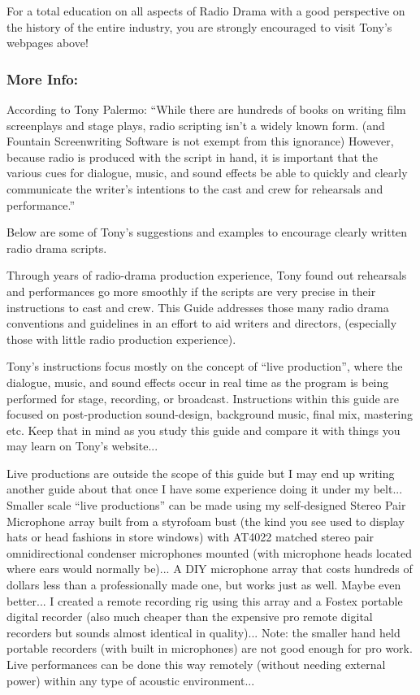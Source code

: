 \documentclass[openleft,oneside,showtrims]{memoir}
\begin{document}
For a total education on all aspects of Radio Drama with a good perspective on the history of the entire industry, you are strongly encouraged to visit Tony's webpages above!

\subsubsection*{More Info:}
\label{sec:org3eb0e5a}
According to Tony Palermo: ``While there are hundreds of books on writing film screenplays and stage plays, radio scripting isn't a widely known form. (and Fountain Screenwriting Software is not exempt from this ignorance) However, because radio is produced with the script in hand, it is important that the various cues for dialogue, music, and sound effects be able to quickly and clearly communicate the writer's intentions to the cast and crew for rehearsals and performance.''

Below are some of Tony's suggestions and examples to encourage clearly written radio drama scripts.

Through years of radio-drama production experience, Tony found out rehearsals and performances go more smoothly if the scripts are very precise in their instructions to cast and crew.  This Guide addresses those many radio drama conventions and guidelines in an effort to aid writers and directors, (especially those with little radio production experience).

Tony's instructions focus mostly on the concept of ``live production'', where the dialogue, music, and sound effects occur in real time as the program is being performed for stage, recording, or broadcast. Instructions within this guide are focused on post-production sound-design, background music, final mix, mastering etc.  Keep that in mind as you study this guide and compare it with things you may learn on Tony's website...  

Live productions are outside the scope of this guide but I may end up writing another guide about that once I have some experience doing it under my belt... Smaller scale ``live productions'' can be made using my self-designed Stereo Pair Microphone array built from a styrofoam bust (the kind you see used to display hats or head fashions in store windows) with AT4022 matched stereo pair omnidirectional condenser microphones mounted (with microphone heads located where ears would normally be)... A DIY microphone array that costs hundreds of dollars less than a professionally made one, but works just as well.  Maybe even better...  I created a remote recording rig using this array and a Fostex portable digital recorder (also much cheaper than the expensive pro remote digital recorders but sounds almost identical in quality)... Note: the smaller hand held portable recorders (with built in microphones) are not good enough for pro work.  Live performances can be done this way remotely (without needing external power) within any type of acoustic environment...  
\end{document}
